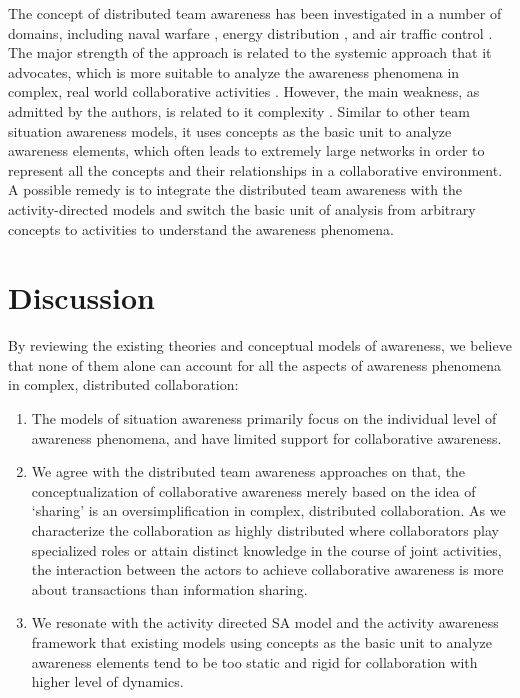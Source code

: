 The concept of distributed team awareness has been investigated in a number of domains, including naval warfare \cite{Stanton2006}, energy distribution \cite{Salmon2008a}, and air traffic control \cite{Stanton2009}. The major strength of the approach is related to the systemic approach that it advocates, which is more suitable to analyze the awareness phenomena in complex, real world collaborative activities \cite{Stanton2009}. However, the main weakness, as admitted by the authors, is related to it complexity \cite{Salmon2010}. Similar to other team situation awareness models, it uses concepts as the basic unit to analyze awareness elements, which often leads to extremely large networks in order to represent all the concepts and their relationships in a collaborative environment. A possible remedy is to integrate the distributed team awareness with the activity-directed models and switch the basic unit of analysis from arbitrary concepts to activities to understand the awareness phenomena.

\section{Discussion} %
\label{sec:discussion}
By reviewing the existing theories and conceptual models of awareness, we believe that none of them alone can account for all the aspects of awareness phenomena in complex, distributed collaboration:

\begin{enumerate}
   \item The models of situation awareness primarily focus on the individual level of awareness phenomena, and have limited support for collaborative awareness. 
   \item We agree with the distributed team awareness approaches \cite{Salmon2010} on that, the conceptualization of collaborative awareness merely based on the idea of `sharing' is an oversimplification in complex, distributed collaboration. As we characterize the collaboration as highly distributed where collaborators play specialized roles or attain distinct knowledge in the course of joint activities, the interaction between the actors to achieve collaborative awareness is more about transactions than information sharing.
   \item We resonate with the activity directed SA model \cite{Bedny1999} and the activity awareness framework \cite{carroll2003a} that existing models using concepts as the basic unit to analyze awareness elements tend to be too static and rigid for collaboration with higher level of dynamics.
\end{enumerate}

